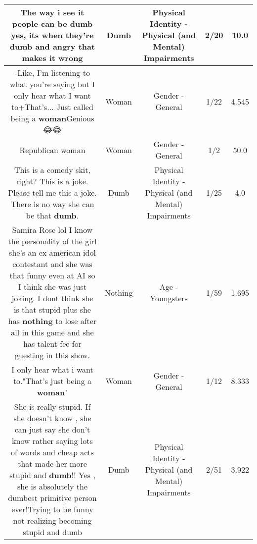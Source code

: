\documentclass[11pt]{article}
\newlength\mylength
\begin{document}
\begin{center}
\begin{longtable}{|C{.65\mylength}|C{.30\mylength}|C{.12\mylength}|C{.12\mylength}|C{.12\mylength}|}
  \small The way i see it people can be \textbf{dumb} yes, its when they're \textbf{dumb} and angry that makes it wrong\normalsize   & Dumb & Physical Identity - Physical (and Mental) Impairments & 2/20 & 10.0 \\  \hline
  \small -Like, I'm listening to what you're saying but I only hear what I want to+That's... Just called being a \textbf{woman}Genious😂😂\normalsize   & Woman & Gender - General & 1/22 & 4.545 \\  \hline
  \small Republican woman\normalsize   & Woman & Gender - General & 1/2 & 50.0 \\  \hline
  \small This is a comedy skit, right? This is a joke. Please tell me this a joke. There is no way she can be that \textbf{dumb}.\normalsize   & Dumb & Physical Identity - Physical (and Mental) Impairments & 1/25 & 4.0 \\  \hline
  \small Samira Rose lol I know the personality of the girl she's an ex american idol contestant and she was that funny even at AI so I think she was just joking. I dont think she is that stupid plus she has \textbf{nothing} to lose after all in this game and she has talent fee for guesting in this show.\normalsize   & Nothing & Age - Youngsters & 1/59 & 1.695 \\  \hline
  \small I only hear what i want to."That's just being a \textbf{woman}"\normalsize   & Woman & Gender - General & 1/12 & 8.333 \\  \hline
  \small She is really stupid.  If she doesn't know , she can just say she don't know rather saying lots of words and cheap acts that made her more stupid and \textbf{dumb}!!   Yes , she is absolutely the dumbest primitive person ever!Trying to be funny not realizing becoming stupid and dumb\normalsize   & Dumb & Physical Identity - Physical (and Mental) Impairments & 2/51 & 3.922 \\  \hline

\end{longtable}
\end{center}
\end{document}

